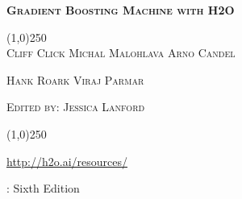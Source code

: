 
%







\thispagestyle{empty} %


\begin{center}
\textsc{\Large\bf{Gradient Boosting Machine with H2O}}

\bigskip
\line(1,0){250}  %
\\
\bigskip
\small
\textsc{Cliff Click  \hspace{10pt} Michal Malohlava \hspace{10pt} Arno Candel}

\textsc{Hank Roark \hspace{10pt} Viraj Parmar}

\textsc{Edited by: Jessica Lanford}

\normalsize

\line(1,0){250}  %

{\url{http://h2o.ai/resources/}}

\bigskip

\monthname \hspace{1pt}  \the\year: Sixth Edition

\bigskip
\end{center}


\newpage
\restoregeometry

\null\vfill %

\thispagestyle{empty}%


